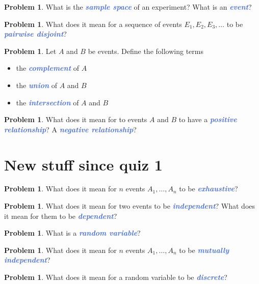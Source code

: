 \documentclass[10pt]{article}
\newcommand{\demph}[1]{\textcolor{RoyalBlue}{\textbf{\slshape #1}}} %
\theoremstyle{definition}
\newtheorem{problem}[theorem]{Problem}
\begin{document}
\begin{problem}
  What is the \demph{sample space} of an experiment? What is an \demph{event}?
\end{problem}


\begin{problem}
  What does it mean for a sequence of events $E_{1},E_{2},E_{3},\ldots $ to be
  \demph{pairwise disjoint}?
\end{problem}

\begin{problem}
  Let $A$ and $B$ be events. Define the following terms
  \begin{itemize}
    \item the \demph{complement} of $A$
    \item the \demph{union} of $A$ and $B$
    \item the \demph{intersection} of $A$ and $B$
  \end{itemize}
\end{problem}

\begin{problem}
  What does it mean for to events $A$ and $B$ to have a \demph{positive relationship}?
  A \demph{negative relationship}?
\end{problem}


\section{New stuff since quiz 1}

\begin{problem}
  What does it mean for $n$ events $A_{1},\ldots,A_{n}$ to be \demph{exhaustive}?
\end{problem}

\begin{problem}
  What does it mean for two events to be \demph{independent}? What does it
  mean for them to be \demph{dependent}?
\end{problem}

\begin{problem}
  What is a \demph{random variable}?
\end{problem}

\begin{problem}
  What does it mean for $n$ events $A_{1},\ldots,A_{n}$ to be \demph{mutually independent}?
\end{problem}





\begin{problem}
  What does it mean for a random variable to be \demph{discrete}?
\end{problem}
\end{document}
